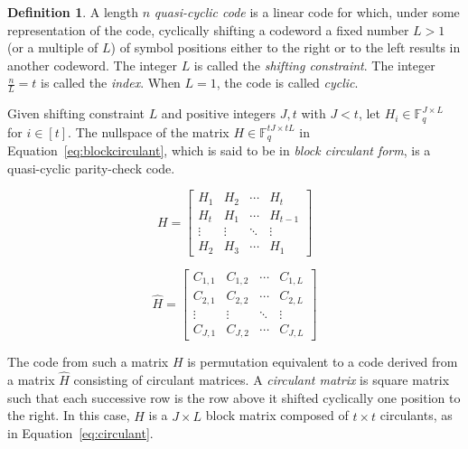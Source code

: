 \documentclass[11pt]{amsart}
\theoremstyle{definition}
\newtheorem{definition}[theorem]{Definition}
\newcommand{\0}{\mathbf{0}}
\newcommand{\F}{\mathbb{F}}
\begin{document}
\begin{definition}
    A length $n$ \textit{quasi-cyclic code} is a linear code for which, under some representation of the code, cyclically shifting a codeword a fixed number $L > 1$ (or a multiple of $L$) of symbol positions either to the right or to the left results in another codeword. The integer $L$ is called the \textit{shifting constraint}. The integer $\frac{n}{L}=t$ is called the \textit{index}. When $L=1$, the code is called \textit{cyclic}.
\end{definition}

Given shifting constraint $L$ and positive integers $J, t$ with $J < t$, let $H_i \in \F_q^{J \times L}$ for $i \in [t]$. The nullspace of the matrix $H \in \F_q^{tJ \times t L}$ in Equation~\ref{eq:blockcirculant}, which is said to be in \textit{block circulant form}, is a quasi-cyclic parity-check code. 

\begin{equation}
   H = \begin{bmatrix} H_1 & H_2 & \dotsm & H_t \\
                       H_t & H_1 & \dotsm & H_{t-1} \\
                       \vdots & \vdots & \ddots & \vdots \\
                       H_2 & H_3 & \dotsm & H_1 \end{bmatrix}
                       \label{eq:blockcirculant}
\end{equation}

\begin{equation}
   \hat{H} = \begin{bmatrix} C_{1,1} & C_{1,2} & \dotsm & C_{1,L} \\
                         C_{2,1} & C_{2,2} & \dotsm & C_{2,L} \\
                         \vdots & \vdots & \ddots & \vdots \\
                         C_{J,1} & C_{J,2} & \dotsm & C_{J,L} \end{bmatrix}
                         \label{eq:circulant}
\end{equation}

The code from such a matrix $H$ is permutation equivalent to a code derived from a matrix $\hat{H}$ consisting of circulant matrices. A \textit{circulant matrix} is square matrix such that each successive row is the row above it shifted cyclically one position to the right. In this case, $\hat{H}$ is a $J \times L$ block matrix composed of $t \times t$ circulants, as in Equation~\ref{eq:circulant}.
\end{document}
